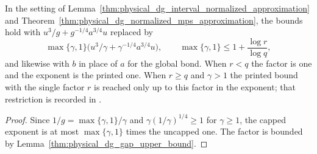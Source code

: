 \begin{lemma}
    \label{thm:physical_dg_uncapped_approximation}
    \leanok
    In the setting of Lemma~\ref{thm:physical_dg_interval_normalized_approximation}
    and Theorem~\ref{thm:physical_dg_normalized_mps_approximation}, the bounds hold
    with $u^3/g+g^{-1/4}a^{3/4}u$ replaced by
    \[
        \max\{\gamma,1\}\bigl(u^3/\gamma+\gamma^{-1/4}a^{3/4}u\bigr),
        \qquad \max\{\gamma,1\}\le1+\frac{\log r}{\log q},
    \]
    and likewise with $b$ in place of $a$ for the global bond. When $r<q$ the
    factor is one and the exponent is the printed one. When $r\ge q$ and
    $\gamma>1$ the printed bound with the single factor $r$ is reached only
    up to this factor in the exponent; that restriction is recorded in
    \cite{gap:alvv16_approximation_parameters}.
\end{lemma}
\begin{proof}
    \leanok
    Since $1/g=\max\{\gamma,1\}/\gamma$ and $\gamma(1/\gamma)^{1/4}\ge1$ for
    $\gamma\ge1$, the capped exponent is at most $\max\{\gamma,1\}$ times the
    uncapped one. The factor is bounded by
    Lemma~\ref{thm:physical_dg_gap_upper_bound}.
\end{proof}

